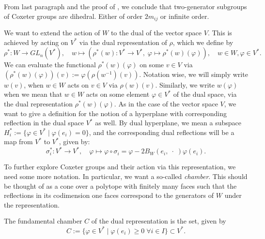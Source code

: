 \begin{remark}
    From last paragraph and the proof of , we conclude that two-generator subgroups of Coxeter groups are dihedral.
    Either of order \(2m_{ij}\) or infinite order.
\end{remark}

We want to extend the action of \(W\) to the dual of the vector space \(V\).
This is achieved by acting on \(V^*\) via the dual representation of \(\rho\), which we define by
\[\rho^* : W \to GL_n(V^*),\quad w \mapsto (\rho^*(w): V^* \to V^*, \; \varphi \mapsto \rho^*(w)(\varphi)), \quad w\in W, \varphi\in V^*.\]
We can evaluate the functional \(\rho^*(w)(\varphi)\) on some \(v \in V\) via \((\rho^*(w)(\varphi))(v) := \varphi(\rho(w^{-1})(v))\).
Notation wise, we will simply write \(w(v)\), when \(w \in W\) acts on \(v \in V\) via \(\rho(w)(v)\).
Similarly, we write \(w(\varphi)\) when we mean that \(w \in W\) acts on some element \(\varphi \in V^*\) of the dual space, via the dual representation \(\rho^*(w)(\varphi)\).
As in the case of the vector space \(V\), we want to give a definition for the notion of a hyperplane with corresponding reflection in the dual space \(V^*\) as well.
By dual hyperplane, we mean a subspace \(H_i^* := \{\varphi \in V^* \;\vert\; \varphi (e_i) = 0\}\), and the corresponding dual reflections will be a map from \(V^*\) to \(V^*\), given by:
\[\sigma_i^* : V^* \to V^*,\quad \varphi \mapsto \varphi \circ \sigma_i = \varphi - 2B_W(e_i,\;\cdot\;)\varphi(e_i).\]

To further explore Coxeter groups and their action via this representation, we need some more notation.
In particular, we want a so-called \emph{chamber}.
This should be thought of as a cone over a polytope with finitely many faces such that the reflections in its codimension one faces correspond to the generators of \(W\) under the representation.

\begin{definition}\label{def:chamber}
    The fundamental chamber \(C\) of the dual representation is the set, given by
    \[C := \{\varphi \in V^* \;\vert\; \varphi (e_i) \geq 0 \;\forall i\in I\} \subset V^*.\]
\end{definition}

